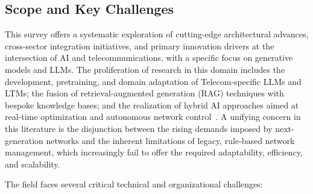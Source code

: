 \documentclass[sigconf]{acmart}
\begin{document}
\subsection{Scope and Key Challenges}

This survey offers a systematic exploration of cutting-edge architectural advances, cross-sector integration initiatives, and primary innovation drivers at the intersection of AI and telecommunications, with a specific focus on generative models and LLMs. The proliferation of research in this domain includes the development, pretraining, and domain adaptation of Telecom-specific LLMs and LTMs; the fusion of retrieval-augmented generation (RAG) techniques with bespoke knowledge bases; and the realization of hybrid AI approaches aimed at real-time optimization and autonomous network control~\cite{ref1, ref2, ref3, ref4, ref5, ref6, ref7, ref8, ref9, ref10, ref11, ref12, ref13, ref14, ref15, ref16, ref17, ref18, ref19, ref20, ref21, ref22, ref23, ref24, ref25, ref26, ref27, ref28, ref29, ref30, ref31, ref32, ref33, ref34, ref35, ref36, ref37, ref38, ref39, ref40, ref46, ref49}. A unifying concern in this literature is the disjunction between the rising demands imposed by next-generation networks and the inherent limitations of legacy, rule-based network management, which increasingly fail to offer the required adaptability, efficiency, and scalability.

The field faces several critical technical and organizational challenges:
\end{document}
